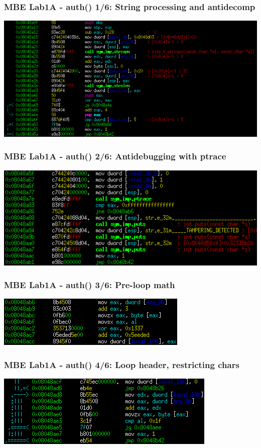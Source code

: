 \documentclass[aspectratio=169]{beamer}
\begin{document}
\begin{frame}[fragile]
\frametitle{MBE Lab1A - auth() 1/6: String processing and antidecomp}
\includegraphics[width=0.9\paperwidth]{pictures/intel/mbe_lab1a_auth_chunk1.png}
\end{frame}

\begin{frame}[fragile]
\frametitle{MBE Lab1A - auth() 2/6: Antidebugging with ptrace}
\includegraphics[width=0.9\paperwidth]{pictures/intel/mbe_lab1a_auth_chunk2.png}
\end{frame}

\begin{frame}[fragile]
\frametitle{MBE Lab1A - auth() 3/6: Pre-loop math}
\includegraphics[width=0.9\paperwidth]{pictures/intel/mbe_lab1a_auth_chunk3.png}
\end{frame}

\begin{frame}[fragile]
\frametitle{MBE Lab1A - auth() 4/6: Loop header, restricting chars}
\includegraphics[width=0.9\paperwidth]{pictures/intel/mbe_lab1a_auth_chunk4.png}
\end{frame}
\end{document}
